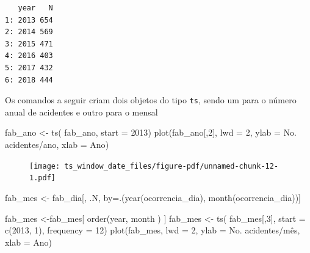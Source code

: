 \documentclass[
  letterpaper,
  DIV=11,
  numbers=noendperiod]{scrreprt}
\newenvironment{Shaded}{\begin{snugshade}}{\end{snugshade}}
\newcommand{\AttributeTok}[1]{\textcolor[rgb]{0.40,0.45,0.13}{#1}}
\newcommand{\DecValTok}[1]{\textcolor[rgb]{0.68,0.00,0.00}{#1}}
\newcommand{\FunctionTok}[1]{\textcolor[rgb]{0.28,0.35,0.67}{#1}}
\newcommand{\NormalTok}[1]{\textcolor[rgb]{0.00,0.23,0.31}{#1}}
\newcommand{\OtherTok}[1]{\textcolor[rgb]{0.00,0.23,0.31}{#1}}
\newcommand{\StringTok}[1]{\textcolor[rgb]{0.13,0.47,0.30}{#1}}
\theoremstyle{plain}
\theoremstyle{definition}
\theoremstyle{definition}
\theoremstyle{remark}
\begin{document}
\begin{verbatim}
   year   N
1: 2013 654
2: 2014 569
3: 2015 471
4: 2016 403
5: 2017 432
6: 2018 444
\end{verbatim}

Os comandos a seguir criam dois objetos do tipo \texttt{ts}, sendo um
para o número anual de acidentes e outro para o mensal

\begin{Shaded}
\begin{Highlighting}[]
\NormalTok{fab\_ano }\OtherTok{\textless{}{-}} \FunctionTok{ts}\NormalTok{( fab\_ano, }\AttributeTok{start =} \DecValTok{2013}\NormalTok{)}
\FunctionTok{plot}\NormalTok{(fab\_ano[,}\DecValTok{2}\NormalTok{], }\AttributeTok{lwd =} \DecValTok{2}\NormalTok{, }\AttributeTok{ylab =} \StringTok{\textquotesingle{}No. acidentes/ano\textquotesingle{}}\NormalTok{, }\AttributeTok{xlab =} \StringTok{\textquotesingle{}Ano\textquotesingle{}}\NormalTok{)}
\end{Highlighting}
\end{Shaded}

\begin{figure}[H]

{\centering \texttt{[image: ts\_window\_date\_files/figure-pdf/unnamed-chunk-12-1.pdf]}

}

\end{figure}

\begin{Shaded}
\begin{Highlighting}[]
\NormalTok{fab\_mes }\OtherTok{\textless{}{-}}\NormalTok{ fab\_dia[, .N, by}\OtherTok{=}\NormalTok{.(}\FunctionTok{year}\NormalTok{(ocorrencia\_dia), }\FunctionTok{month}\NormalTok{(ocorrencia\_dia))]}

\NormalTok{fab\_mes }\OtherTok{\textless{}{-}}\NormalTok{fab\_mes[ }\FunctionTok{order}\NormalTok{(year, month ) ]}
\NormalTok{fab\_mes }\OtherTok{\textless{}{-}} \FunctionTok{ts}\NormalTok{( fab\_mes[,}\DecValTok{3}\NormalTok{], }\AttributeTok{start =} \FunctionTok{c}\NormalTok{(}\DecValTok{2013}\NormalTok{, }\DecValTok{1}\NormalTok{), }\AttributeTok{frequency =} \DecValTok{12}\NormalTok{)}
\FunctionTok{plot}\NormalTok{(fab\_mes, }\AttributeTok{lwd =} \DecValTok{2}\NormalTok{, }\AttributeTok{ylab =} \StringTok{\textquotesingle{}No. acidentes/mês\textquotesingle{}}\NormalTok{, }\AttributeTok{xlab =} \StringTok{\textquotesingle{}Ano\textquotesingle{}}\NormalTok{)}
\end{Highlighting}
\end{Shaded}
\end{document}

